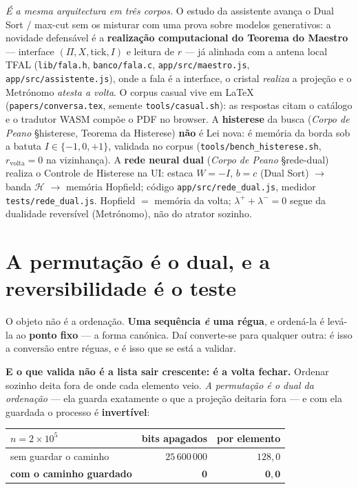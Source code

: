 \documentclass[11pt,a4paper]{article}
\newcommand{\code}[1]{\texttt{\small #1}}
\begin{document}
\noindent \emph{É a mesma arquitectura em três corpos.} O estudo da assistente avança o Dual Sort /
max-cut sem os misturar com uma prova sobre modelos generativos: a novidade defensável é a
\textbf{realização computacional do Teorema do Maestro} --- interface $(\Pi,X,\mathrm{tick},I)$ e
leitura de $r$ --- já alinhada com a antena local TFAL (\code{lib/fala.h}, \code{banco/fala.c},
\code{app/src/maestro.js}, \code{app/src/assistente.js}), onde a fala é a interface, o cristal
\emph{realiza} a projeção e o Metrónomo \emph{atesta a volta}. O corpus casual vive em
\LaTeX{} (\code{papers/conversa.tex}, semente \code{tools/casual.sh}): as respostas citam o
catálogo e o tradutor WASM compõe o PDF no browser. A \textbf{histerese} da busca
(\emph{Corpo de Peano} \S histerese, Teorema da Histerese) \textbf{não} é Lei nova:
é memória da borda sob a batuta $I\in\{-1,0,+1\}$, validada no corpus
(\code{tools/bench\_histerese.sh}, $r_{\mathrm{volta}}=0$ na vizinhança).
A \textbf{rede neural dual} (\emph{Corpo de Peano} \S rede-dual) realiza o Controle
de Histerese na UI: estaca $W=-I$, $b=c$ (Dual Sort) $\to$ banda $\mathcal{H}$ $\to$
memória Hopfield; código \code{app/src/rede\_dual.js}, medidor
\code{tests/rede\_dual.js}. Hopfield $=$ memória da volta; $\lambda^{+}+\lambda^{-}=0$
segue da dualidade reversível (Metrónomo), não do atrator sozinho.

\section{A permutação é o dual, e a reversibilidade é o teste}

O objeto não é a ordenação. \textbf{Uma sequência \emph{é} uma régua}, e ordená-la é levá-la ao
\textbf{ponto fixo} --- a forma canónica. Daí converte-se para qualquer outra: é isso a conversão
entre réguas, e é isso que se está a validar.

\smallskip
\noindent \textbf{E o que valida não é a lista sair crescente: é a volta fechar.} Ordenar sozinho
deita fora de onde cada elemento veio. \emph{A permutação é o dual da ordenação} --- ela guarda
exatamente o que a projeção deitaria fora --- e com ela guardada o processo é \textbf{invertível}:

\begin{center}\small
\begin{tabular}{@{}lrr@{}}
\toprule
$n=2\times10^{5}$ & bits apagados & por elemento \\
\midrule
sem guardar o caminho & $25\,600\,000$ & $128{,}0$ \\
\textbf{com o caminho guardado} & $\mathbf{0}$ & $\mathbf{0{,}0}$ \\
\bottomrule
\end{tabular}
\end{center}
\end{document}
